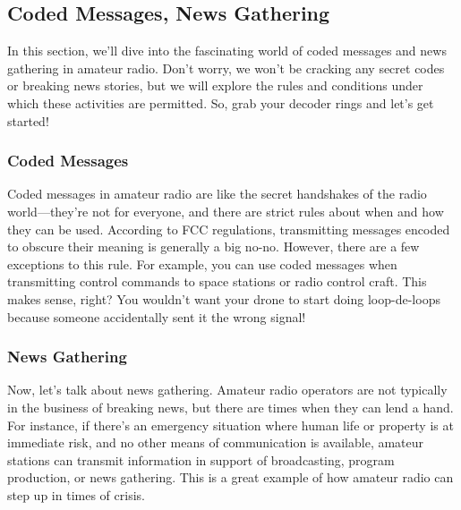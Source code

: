 \subsection{Coded Messages, News Gathering}
\label{subsec:coded-news}

In this section, we'll dive into the fascinating world of coded messages and news gathering in amateur radio. Don't worry, we won't be cracking any secret codes or breaking news stories, but we will explore the rules and conditions under which these activities are permitted. So, grab your decoder rings and let's get started!

\subsubsection*{Coded Messages}
Coded messages in amateur radio are like the secret handshakes of the radio world—they're not for everyone, and there are strict rules about when and how they can be used. According to FCC regulations, transmitting messages encoded to obscure their meaning is generally a big no-no. However, there are a few exceptions to this rule. For example, you can use coded messages when transmitting control commands to space stations or radio control craft. This makes sense, right? You wouldn't want your drone to start doing loop-de-loops because someone accidentally sent it the wrong signal!

\subsubsection*{News Gathering}
Now, let's talk about news gathering. Amateur radio operators are not typically in the business of breaking news, but there are times when they can lend a hand. For instance, if there's an emergency situation where human life or property is at immediate risk, and no other means of communication is available, amateur stations can transmit information in support of broadcasting, program production, or news gathering. This is a great example of how amateur radio can step up in times of crisis.


